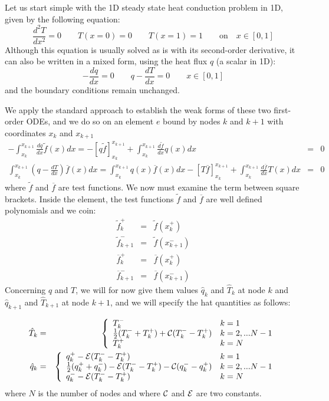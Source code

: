 Let us start simple with the 1D steady state heat conduction problem in 1D, given by the following 
equation:
\begin{equation}
\frac{d^2T}{dx^2}=0 \qquad T(x=0)=0 \qquad T(x=1)=1 \qquad \text{on} \quad x\in[0,1]
\end{equation}
Although this equation is usually solved as is with its second-order derivative, it can also 
be written in a mixed form, using the heat flux $q$ (a scalar in 1D):
\[
-\frac{dq}{dx}=0 \qquad q-\frac{dT}{dx}=0 \qquad x\in[0,1]
\]
and the boundary conditions remain unchanged. 

We apply the standard approach to establish the weak forms of these two first-order ODEs, and we do so 
on an element $e$ bound by nodes $k$ and $k+1$ with coordinates $x_k$ and $x_{k+1}$
\begin{eqnarray}
-\int_{x_k}^{x_{k+1}} \frac{dq}{dx} \tilde{f}(x) dx = -\left[q \tilde{f} \right]_{x_k}^{x_{k+1}} 
+ \int_{x_k}^{x_{k+1}} \frac{d\tilde{f}}{dx} q(x) dx &=& 0
\label{eq:dg1}\\
\int_{x_k}^{x_{k+1}}  \left( q-\frac{dT}{dx} \right) \overline{f}(x) dx
=
\int_{x_k}^{x_{k+1}}  q(x) \overline{f}(x) dx
-\left[ T \overline{f}  \right]_{x_k}^{x_{k+1}} + \int_{x_k}^{x_{k+1}} \frac{d\overline{f}}{dx} T(x) dx 
&=& 0
\label{eq:dg2}
\end{eqnarray}
where $\tilde{f}$ and $\overline{f}$ are test functions.
We now must examine the term between square brackets. 
Inside the element, the test functions $\tilde{f}$ and $\overline{f}$ are well defined polynomials
and we coin:
\begin{eqnarray}
\tilde{f}_k^+&=&\tilde{f}(x_k^+)\\
\tilde{f}_{k+1}^-&=&\tilde{f}(x_{k+1}^-)\\
\overline{f}_k^+&=&\overline{f}(x_k^+)\\
\overline{f}_{k+1}^-&=&\overline{f}(x_{k+1}^-)
\end{eqnarray}
Concerning $q$ and $T$, we will for now  give them values $\hat{q}_k$ and $\hat{T}_k$ at node $k$
and $\hat{q}_{k+1}$ and $\hat{T}_{k+1}$ at node $k+1$, and we will specify the hat quantities as follows:

\begin{eqnarray}
\hat{T}_k &=&
\left\{
\begin{array}{ll}
T_k^-   & k=1 \\ 
\frac{1}{2}(T_k^-+T_k^+) + {\cal C} (T_k^- - T_k^+) & k=2,...N-1\\
T_k^+    & k=N \\ 
\end{array}
\right. \nonumber\\
\hat{q}_k &=&
\left\{
\begin{array}{ll}
q_k^+ -{\cal E} (T_k^--T_k^+)  & k=1 \\ 
\frac{1}{2}(q_k^+ + q_k^-) - {\cal E} (T_k^- - T_k^+) - {\cal C}(q_k^- - q_k^+) & k=2,...N-1\\
q_k^- -{\cal E} (T_k^--T_k^+)    & k=N \\ 
\end{array}
\right.
\end{eqnarray}
where $N$ is the number of nodes and where ${\cal C}$ and ${\cal E}$ are two constants. 

